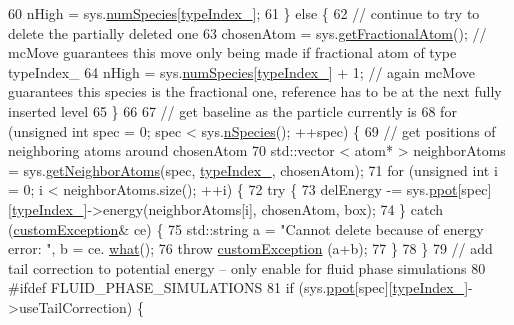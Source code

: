 \begin{DoxyCode}
60             nHigh = sys.\hyperlink{classsim_system_a9eea865e6dc1cff377b1e79c4d9c23f0}{numSpecies}[\hyperlink{classmc_move_acb731965547b0326ef318ec96da8b46a}{typeIndex\_}];
61         \} \textcolor{keywordflow}{else} \{
62             \textcolor{comment}{// continue to try to delete the partially deleted one}
63             chosenAtom = sys.\hyperlink{classsim_system_a2ab77377c60e0e3109a6e875690b0ab7}{getFractionalAtom}(); \textcolor{comment}{// mcMove guarantees this move only
       being made if fractional atom of type typeIndex\_}
64             nHigh = sys.\hyperlink{classsim_system_a9eea865e6dc1cff377b1e79c4d9c23f0}{numSpecies}[\hyperlink{classmc_move_acb731965547b0326ef318ec96da8b46a}{typeIndex\_}] + 1; \textcolor{comment}{// again mcMove guarantees this
       species is the fractional one, reference has to be at the next fully inserted level}
65     \}
66 
67         \textcolor{comment}{// get baseline as the particle currently is}
68         \textcolor{keywordflow}{for} (\textcolor{keywordtype}{unsigned} \textcolor{keywordtype}{int} spec = 0; spec < sys.\hyperlink{classsim_system_ab5e2e9b6204de15520302fe1d51688dd}{nSpecies}(); ++spec) \{
69             \textcolor{comment}{// get positions of neighboring atoms around chosenAtom}
70             std::vector < atom* > neighborAtoms = sys.\hyperlink{classsim_system_a9b3aeefa22c3b50b5913df6eea753bc6}{getNeighborAtoms}(spec, 
      \hyperlink{classmc_move_acb731965547b0326ef318ec96da8b46a}{typeIndex\_}, chosenAtom);
71             \textcolor{keywordflow}{for} (\textcolor{keywordtype}{unsigned} \textcolor{keywordtype}{int} i = 0; i < neighborAtoms.size(); ++i) \{
72                     \textcolor{keywordflow}{try} \{
73                 delEnergy -= sys.\hyperlink{classsim_system_ad2e290b5963f132e6a3a56cee35c8e9f}{ppot}[spec][\hyperlink{classmc_move_acb731965547b0326ef318ec96da8b46a}{typeIndex\_}]->energy(neighborAtoms[i], chosenAtom,
       box);
74             \} \textcolor{keywordflow}{catch} (\hyperlink{classcustom_exception}{customException}& ce) \{
75                 std::string a = \textcolor{stringliteral}{"Cannot delete because of energy error: "}, b = ce.
      \hyperlink{classcustom_exception_aeb6ab5848b038adfc68fde86a512f691}{what}();
76                 \textcolor{keywordflow}{throw} \hyperlink{classcustom_exception}{customException} (a+b);
77             \}
78             \}
79             \textcolor{comment}{// add tail correction to potential energy -- only enable for fluid phase simulations}
80 \textcolor{preprocessor}{#ifdef FLUID\_PHASE\_SIMULATIONS}
81 \textcolor{preprocessor}{}            \textcolor{keywordflow}{if} (sys.\hyperlink{classsim_system_ad2e290b5963f132e6a3a56cee35c8e9f}{ppot}[spec][\hyperlink{classmc_move_acb731965547b0326ef318ec96da8b46a}{typeIndex\_}]->useTailCorrection) \{

\end{DoxyCode}
